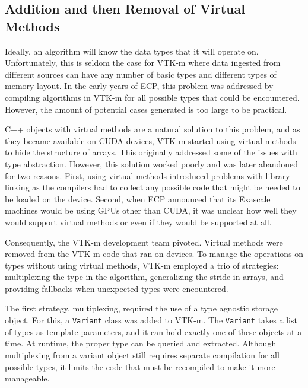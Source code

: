 

\subsection{Addition and then Removal of Virtual Methods}
\label{sec:virtual-methods}


Ideally, an algorithm
will know the data types that it will operate on.
Unfortunately, this is seldom the case for VTK-m where data ingested from different sources can have any number of basic types
and different types of memory layout.
In the early years of ECP, this problem was addressed by compiling algorithms in VTK-m for all possible types that could be encountered.
However, the amount of potential cases generated is too large to be practical.

C++ objects with virtual methods are a natural solution to this problem, and as they became available on CUDA devices, VTK-m started using virtual methods to hide the structure of arrays.
This originally addressed some of the issues with type abstraction.
However, this solution worked poorly and was later abandoned for two reasons.
First, using virtual methods introduced problems with library linking as the compilers had to collect any possible code that might be needed to be loaded on the device.
Second, when ECP announced that its Exascale machines would be using GPUs other than CUDA, it was unclear how well they would support virtual methods or even if they would be supported at all.

Consequently, the VTK-m development team pivoted.
Virtual methods were removed from the VTK-m code that ran on devices.
To manage the operations on types without using virtual methods, VTK-m employed a trio of strategies: multiplexing the type in the algorithm, generalizing the stride in arrays, and providing fallbacks when unexpected types were encountered.

The first strategy, multiplexing, required the use of a type agnostic storage object.
For this, a \texttt{Variant} class was added to VTK-m.
The \texttt{Variant} takes a list of types as template parameters, and it can hold exactly one of these objects at a time.
At runtime, the proper type can be queried and extracted.
Although multiplexing from a variant object still requires separate compilation for all possible types, it limits the code that must be recompiled to make it more manageable.

